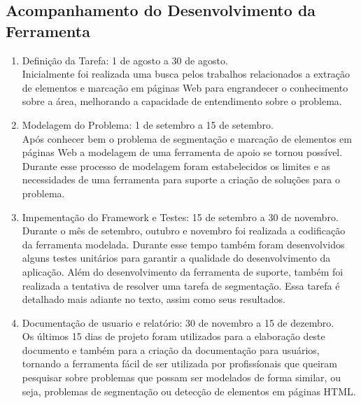 \documentclass[12pt, a4paper]{article}
\begin{document}
  \subsection{Acompanhamento do Desenvolvimento da Ferramenta}
\begin{enumerate}
\item Definição da Tarefa: 1 de agosto a 30 de agosto. \\
Inicialmente foi realizada uma busca pelos trabalhos relacionados a
extração de elementos e marcação em páginas Web para engrandecer o
conhecimento sobre a área, melhorando a capacidade de entendimento
sobre o problema.

\item Modelagem do Problema: 1 de setembro a 15 de setembro. \\ 
Após conhecer bem o problema de segmentação e marcação de elementos em
páginas Web a modelagem de uma ferramenta de apoio se tornou possível.
Durante esse processo de modelagem foram estabelecidos os limites e as
necessidades de uma ferramenta para suporte a criação de soluções para
o problema.

\item Impementação do Framework e Testes: 15 de setembro a 30 de
novembro. \\
Durante o mês de setembro, outubro e novembro foi realizada a
codificação da ferramenta modelada. Durante esse tempo também foram
desenvolvidos alguns testes unitários para garantir a qualidade do
desenvolvimento da aplicação. Além do desenvolvimento da ferramenta de
suporte, também foi realizada a tentativa de resolver uma tarefa de
segmentação. Essa tarefa é detalhado mais adiante no texto, assim como
seus resultados.

\item Documentação de usuario e relatório: 30 de novembro a 15 de
dezembro. \\
Os últimos 15 dias de projeto foram utilizados para a elaboração deste
documento e também para a criação da documentação para usuários,
tornando a ferramenta fácil de ser utilizada por profissíonais que
queiram pesquisar sobre problemas que possam ser modelados de forma
similar, ou seja, problemas de segmentação ou detecção de elementos em
páginas HTML.
\end{enumerate}
\end{document}
